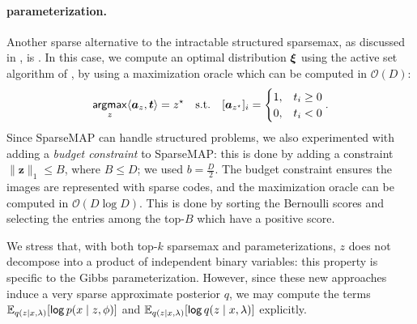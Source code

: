 \paragraph*{\smap parameterization.} Another sparse alternative to the
intractable structured sparsemax, as discussed in
, is \smap. In this case, we compute an optimal
distribution $\bm{\xi}$ using the active set algorithm of
\citet{niculae2018sparsemap}, by using a maximization oracle which
can be computed in $\mathcal{O}(D)$:
\begin{equation}
    \operatorname*{\mathsf{argmax}}_z \langle\bm{a}_z,\bm{t}\rangle = z^\star \quad \text{s.t.}\quad
    [\bm{a}_{z^\star}]_i = \begin{cases}
        1, & t_i \geq 0 \\
        0, & t_i < 0    \\
    \end{cases}.
\end{equation}
Since SparseMAP can handle structured problems, we also experimented
with adding a \emph{budget constraint} to SparseMAP: this is done by
adding a constraint $\|\bm{z}\|_1 \le B$, where $B \le D$; we used
$b=\frac{D}{2}$. The budget constraint ensures the images are
represented with sparse codes, and the maximization oracle can be
computed in $\mathcal{O}(D \log D)$. This
is done by sorting the Bernoulli scores and selecting the entries
among the top-$B$ which have a positive score.

We stress that, with both top-$k$ sparsemax and \smap parameterizations,
$z$ does not decompose into a product of independent
binary variables: this property is specific to the Gibbs parameterization.
However, since these new approaches induce a very sparse approximate posterior
$q$, we may compute the terms $\mathbb{E}_{q(z\mid x, \lambda)} [\operatorname*{\mathsf{log}} p(x \mid z,
        \phi)]$ and $\mathbb{E}_{q(z\mid x, \lambda)} [\operatorname*{\mathsf{log}} q(z \mid x, \lambda)]$
explicitly.

